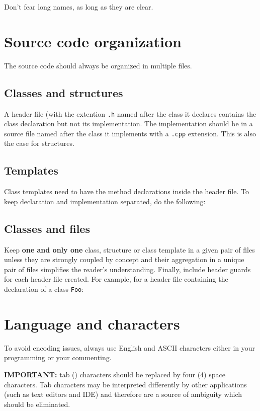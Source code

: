 
Don't fear long names, as long as they are clear.


\section{Source code organization}

The source code should always be organized in multiple files.

\subsection{Classes and structures}
A header file (with the extention \texttt{.h} named after the class it declares 
contains the class declaration but not its implementation. The implementation 
should be in a source file named after the class it implements with a 
\texttt{.cpp} extension. This is also the case for structures.

\subsection{Templates}
Class templates need to have the method declarations inside the header file. To 
keep declaration and implementation separated, do the following:



\subsection{Classes and files}
Keep \textbf{one and only one} class, structure or class template in a given pair of
 files unless they are strongly coupled by concept and their aggregation 
in a unique pair of files simplifies the reader's understanding. Finally, include 
header guards for each header file created. For example, for a header file containing 
the declaration of a class \texttt{Foo}:


\section{Language and characters}
To avoid encoding issues, always use English and ASCII characters either in 
your programming or your commenting.

\textbf{IMPORTANT:} tab () characters should be replaced by 
four (4) space characters. Tab characters may be interpreted differently by other 
applications (such as text editors and IDE) and therefore are a source of ambiguity 
which should be eliminated.
